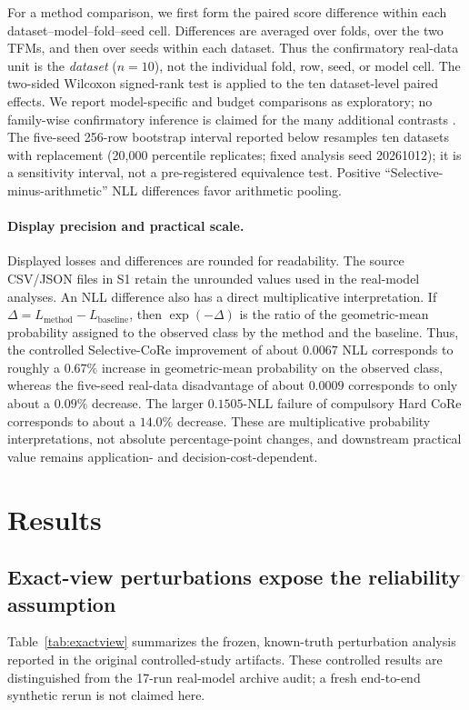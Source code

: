 \documentclass[a4paper,fleqn]{cas-sc}
\begin{document}
For a method comparison, we first form the paired score difference within each dataset--model--fold--seed cell. Differences are averaged over folds, over the two TFMs, and then over seeds within each dataset. Thus the confirmatory real-data unit is the \emph{dataset} ($n=10$), not the individual fold, row, seed, or model cell. The two-sided Wilcoxon signed-rank test is applied to the ten dataset-level paired effects. We report model-specific and budget comparisons as exploratory; no family-wise confirmatory inference is claimed for the many additional contrasts \citep{demsar2006comparisons}. The five-seed 256-row bootstrap interval reported below resamples ten datasets with replacement (20,000 percentile replicates; fixed analysis seed 20261012); it is a sensitivity interval, not a pre-registered equivalence test. Positive ``Selective-minus-arithmetic'' NLL differences favor arithmetic pooling.

\paragraph{Display precision and practical scale.} Displayed losses and differences are rounded for readability. The source CSV/JSON files in S1 retain the unrounded values used in the real-model analyses. An NLL difference also has a direct multiplicative interpretation. If $\Delta=L_{\mathrm{method}}-L_{\mathrm{baseline}}$, then $\exp(-\Delta)$ is the ratio of the geometric-mean probability assigned to the observed class by the method and the baseline. Thus, the controlled Selective-CoRe improvement of about $0.0067$ NLL corresponds to roughly a $0.67\%$ increase in geometric-mean probability on the observed class, whereas the five-seed real-data disadvantage of about $0.0009$ corresponds to only about a $0.09\%$ decrease. The larger $0.1505$-NLL failure of compulsory Hard CoRe corresponds to about a $14.0\%$ decrease. These are multiplicative probability interpretations, not absolute percentage-point changes, and downstream practical value remains application- and decision-cost-dependent.

\section{Results}
\subsection{Exact-view perturbations expose the reliability assumption}
Table~\ref{tab:exactview} summarizes the frozen, known-truth perturbation analysis reported in the original controlled-study artifacts. These controlled results are distinguished from the 17-run real-model archive audit; a fresh end-to-end synthetic rerun is not claimed here.
\end{document}
